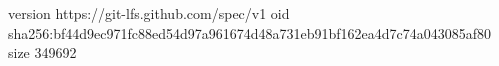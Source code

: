 version https://git-lfs.github.com/spec/v1
oid sha256:bf44d9ec971fc88ed54d97a961674d48a731eb91bf162ea4d7c74a043085af80
size 349692
